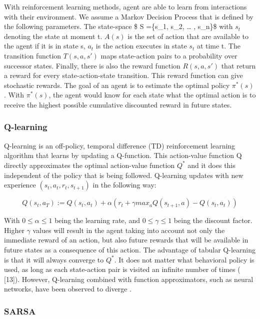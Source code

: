 \documentclass[letterpaper]{article}
\begin{document}
With reinforcement learning methods, agent are able to learn from
interactions with their environment. We assume a Markov Decision Process
that is defined by the following parameters. The state-space \$ S
=\{s\_1, s\_2, \ldots{} , s\_n\}\$ with \(s_t\) denoting the state at
moment t. \(A(s)\) is the set of action that are available to the agent
if it is in state s, \(a_t\) is the action executes in state \(s_t\) at
time t. The transition function \(T(s,a,s')\) maps state-action pairs to
a probability over successor states. Finally, there is also the reward
function \(R(s,a,s')\) that return a reward for every state-action-state
transition. This reward function can give stochastic rewards. The goal
of an agent is to estimate the optimal policy \(\pi^*(s)\). With
\(\pi^*(s)\), the agent would know for each state what the optimal
action is to receive the highest possible cumulative discounted reward
in future states.

\subsubsection{Q-learning}\label{q-learning}

Q-learning is an off-policy, temporal difference (TD) reinforcement
learning algorithm that learns by updating a Q-function. This
action-value function Q directly approximates the optimal action-value
function \(Q^*\) and it does this independent of the policy that is
being followed. Q-learning updates with new experience
\((s_t, a_t, r_t, s_{t+1})\) in the following way:

\[Q(s_t,a_T) := Q(s_t,a_t) + \alpha ( r_t + \gamma max_a Q(s_{t+1}, a) - Q(s_t,a_t) )\]

With \(0 \leq \alpha \leq 1\) being the learning rate, and
\(0 \leq \gamma \leq 1\) being the discount factor. Higher \(\gamma\)
values will result in the agent taking into account not only the
immediate reward of an action, but also future rewards that will be
available in future states as a consequence of this action. The
advantage of tabular Q-learning is that it will always converge to
\(Q^*\). It does not matter what behavioral policy is used, as long as
each state-action pair is visited an infinite number of times (\cite{wiering2007} {[}13{]}). However, Q-learning combined with function
approximators, such as neural networks, have been observed to diverge
\cite{wiering2007}.

\subsubsection{SARSA}\label{sarsa}
\end{document}
